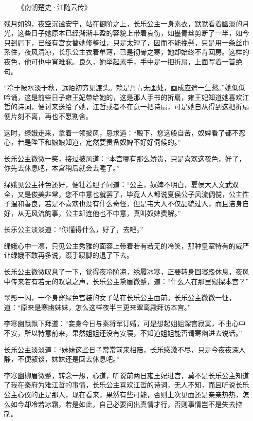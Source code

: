 ——《南朝楚史·江随云传》

残月如钩，夜空沉谧安宁，站在御阶之上，长乐公主一身素衣，默默看着幽淡的月光，这些日子她原本已经渐渐丰盈的容貌上带着哀伤，如墨青丝剪断了一半，如今只到肩下，已经有宫女替她修整过，只是太短了，因而不能挽髻，只是用一条丝巾系住，夜风清凉，长乐公主衣着单薄，已是彻骨之寒，她却始终不肯回房。这样的夜色，他可也中宵难寐。良久，她举起素手，手中是一把折扇，上面写着一首绝句。

“冷于陂水淡于秋，远陌初穷见渡头。赖是丹青无画处，画成应遣一生愁。”她低低吟诵，这是前些日子雍王妃带给她的，这是那人手书的折扇，雍王妃知道她喜欢江哲的诗词，便讨来送给了她，江哲或者不在意一把诗扇，可是她自从得到这把折扇便片刻不离，再也不愿割舍。

这时，绿娥走来，拿着一领披风，恳求道：“殿下，您这般自苦，奴婢看了都不忍心，若是陛下和娘娘知道，定然要责备奴婢不好好伺候的。”

长乐公主微微一笑，接过披风道：“本宫哪有那么娇贵，只是喜欢这夜色，好了，你先去休息吧，本宫稍后就会去睡了。”

绿娥见公主神色还好，便壮着胆子问道：“公主，奴婢不明白，夏侯大人文武双全，又是俊美非常，您不中意也就罢了，毕竟人人都说夏侯公子风流倜傥，公主性子温和善良，若是不喜欢也没有什么奇怪，但是韦大人不仅品貌过人，而且洁身自好，从无风流韵事，公主却连他也不中意，真叫奴婢费解。”

长乐公主淡淡道：“你懂得什么，好了，去吧。”

绿娥心中一凛，只见公主秀雅的面容上带着若有若无的冷笑，那种皇室特有的威严让绿娥不敢再多说，蹑手蹑脚的退了下去。

长乐公主微微叹息了一下，觉得夜冷阶凉，绣履冰寒，正要转身回寝殿休息，夜风中传来若有若无的叹息之声，长乐公主黛眉微蹙，道：“什么人在那里窥探本宫？”

翠影一闪，一个身穿绿色宫装的女子站在长乐公主面前。长乐公主微微一怔，道：“原来是寒幽妹妹，怎么这样夜半三更来翠鸾殿拜访本宫。”

李寒幽飘飘下拜道：“妾身今日与秦将军订婚，可是想起姐姐深宫寂寞，不由心中不安，所以特意前来，果然姐姐还没有安寝，不知道姐姐能否请寒幽进去说话。”

长乐公主淡淡道：“妹妹这些日子常常前来相陪，长乐感激不尽，只是今夜夜深人静，不便叙谈，妹妹还是回去休息吧。”

李寒幽柳眉微蹙，转念一想，心道，听说前两日雍王妃进宫，莫不是长乐公主知道了我在秦府为难江哲的事情，长乐公主喜欢江哲的诗词，无人不知，而且听说长乐公主心仪的正是那人，现在看来，果然有些可能，否则上次见面还是亲亲热热，怎么如今却冷若冰霜，若是如此，自己必要问出真情才行，否则事情岂不是失去控制。


